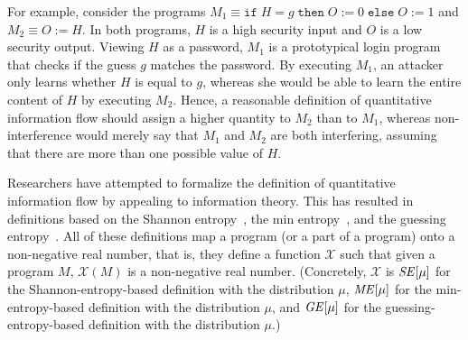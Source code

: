 \documentclass[]{eptcs}
\newcommand{\ttif}[3]{\texttt{if}\;{#1}\;\texttt{then}\;{#2}\;\texttt{else}\;{#3}}
\newcommand{\ttassign}[2]{{#1}\;\texttt{:=}\;{#2}}
\begin{document}
For example, consider the programs $M_1 \equiv \ttif{H =
  g}{\ttassign{O}{0}}{\ttassign{O}{1}}$ and $M_2 \equiv
\ttassign{O}{H}$.  In both programs, $H$ is a high security input and
$O$ is a low security output.  Viewing $H$ as a password, $M_1$ is a
prototypical login program that checks if the guess $g$ matches the
password.  By executing $M_1$, an attacker only learns whether $H$ is
equal to $g$, whereas she would be able to learn the entire content of
$H$ by executing $M_2$.  Hence, a reasonable definition of
quantitative information flow should assign a higher quantity to $M_2$
than to $M_1$, whereas non-interference would merely say that $M_1$
and $M_2$ are both interfering, assuming that there are more than one
possible value of $H$.

Researchers have attempted to formalize the definition of quantitative
information flow by appealing to information theory.  This has
resulted in definitions based on the Shannon
entropy~\cite{denning82,clarkjcs2007,malacaria:popl2007}, the min
entropy~\cite{smith09}, and the guessing
entropy~\cite{kopf07,DBLP:conf/sp/BackesKR09}.  All of these
definitions map a program (or a part of a program) onto a non-negative
real number, that is, they define a function $\mathcal{X}$ such that
given a program $M$, $\mathcal{X}(M)$ is a non-negative real number.
(Concretely, $\mathcal{X}$ is ${\it SE}[\mu]$ for the
Shannon-entropy-based definition with the distribution $\mu$, ${\it
  ME}[\mu]$ for the min-entropy-based definition with the distribution
$\mu$, and ${\it GE}[\mu]$ for the guessing-entropy-based definition
with the distribution $\mu$.)
\end{document}
